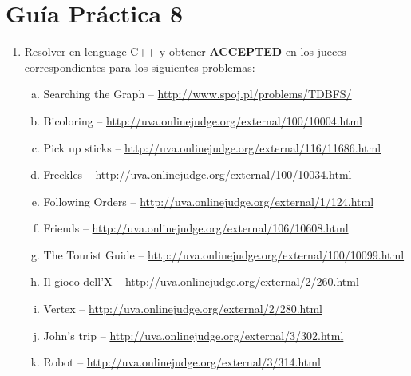 




\section*{Gu\'ia Pr\'actica 8}

\begin{enumerate}[1 -]
	
	\item Resolver en lenguage C++ y obtener \textbf{ACCEPTED} en los jueces correspondientes para los siguientes problemas:
	
	\begin{enumerate}[a)]	
		\item  Searching the Graph -- \href{http://www.spoj.pl/problems/TDBFS/}{http://www.spoj.pl/problems/TDBFS/}
		\item  Bicoloring -- \href{http://uva.onlinejudge.org/external/100/10004.html}{http://uva.onlinejudge.org/external/100/10004.html}
		\item  Pick up sticks -- \href{http://uva.onlinejudge.org/external/116/11686.html}{http://uva.onlinejudge.org/external/116/11686.html}
		\item Freckles -- \href{http://uva.onlinejudge.org/external/100/10034.html}{http://uva.onlinejudge.org/external/100/10034.html}
		\item  Following Orders -- \href{http://uva.onlinejudge.org/external/1/124.html}{http://uva.onlinejudge.org/external/1/124.html}
		\item Friends -- \href{http://uva.onlinejudge.org/external/106/10608.html}{http://uva.onlinejudge.org/external/106/10608.html}
		\item  The Tourist Guide -- \href{http://uva.onlinejudge.org/external/100/10099.html}{http://uva.onlinejudge.org/external/100/10099.html}
		\item Il gioco dell’X -- \href{http://uva.onlinejudge.org/external/2/260.html}{http://uva.onlinejudge.org/external/2/260.html}
		\item Vertex -- \href{http://uva.onlinejudge.org/external/2/280.html}{http://uva.onlinejudge.org/external/2/280.html}
		\item John’s trip -- \href{http://uva.onlinejudge.org/external/3/302.html}{http://uva.onlinejudge.org/external/3/302.html}
		\item Robot -- \href{http://uva.onlinejudge.org/external/3/314.html}{http://uva.onlinejudge.org/external/3/314.html}
	\end{enumerate}
\end{enumerate}

